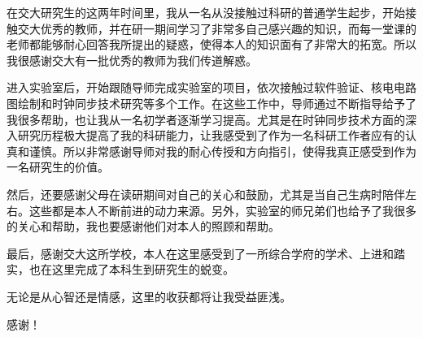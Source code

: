 \begin{thanks}

在交大研究生的这两年时间里，我从一名从没接触过科研的普通学生起步，开始接触交大优秀的教师，并在研一期间学习了非常多自己感兴趣的知识，而每一堂课的老师都能够耐心回答我所提出的疑惑，使得本人的知识面有了非常大的拓宽。所以我很感谢交大有一批优秀的教师为我们传道解惑。

进入实验室后，开始跟随导师完成实验室的项目，依次接触过软件验证、核电电路图绘制和时钟同步技术研究等多个工作。在这些工作中，导师通过不断指导给予了我很多帮助，也让我从一名初学者逐渐学习提高。尤其是在时钟同步技术方面的深入研究历程极大提高了我的科研能力，让我感受到了作为一名科研工作者应有的认真和谨慎。所以非常感谢导师对我的耐心传授和方向指引，使得我真正感受到作为一名研究生的价值。

然后，还要感谢父母在读研期间对自己的关心和鼓励，尤其是当自己生病时陪伴左右。这些都是本人不断前进的动力来源。另外，实验室的师兄弟们也给予了我很多的关心和帮助，我也要感谢他们对本人的照顾和帮助。

最后，感谢交大这所学校，本人在这里感受到了一所综合学府的学术、上进和踏实，也在这里完成了本科生到研究生的蜕变。

无论是从心智还是情感，这里的收获都将让我受益匪浅。

感谢！
\end{thanks}
